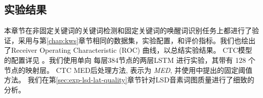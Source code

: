 %
%

\subsection{实验结果}

本章节在非固定关键词的关键词检测和固定关键词的唤醒词识别任务上都进行了验证，采用与第\ref{chap:kws}章节相同的数据集，实验配置，和评价指标。我们也绘出了Receiver Operating Characteristic (ROC) 曲线，以总结实验结果。
CTC模型的配置详见 \cite{7736093}。我们使用单向 每层384节点的两层LSTM 进行实验，其带有 128 个节点的映射层。
CTC MED后处理方法, 表示为 {\em{MED}}, 并使用\cite{7736093}中提出的固定阈值方法。
我们在第\ref{sec:exp-lsd-lat-quality}章节针对LSD音素词图质量进行了细致的分析。


